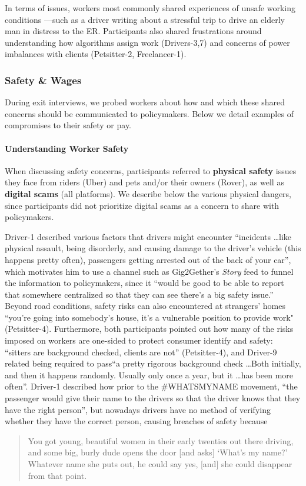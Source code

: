 In terms of issues, workers most commonly shared experiences of unsafe working conditions ---such as a driver writing about a stressful trip to drive an elderly man in distress to the ER. 
Participants also shared frustrations around understanding how algorithms assign work (Drivers-3,7) and concerns of power imbalances with clients (Petsitter-2, Freelancer-1).

\subsubsection{{Safety \& Wages}} 

{During exit interviews, we probed workers about how and which these shared concerns should be communicated to policymakers.} Below we detail examples of compromises to their safety or pay. 

\paragraph{\textbf{Understanding Worker Safety}}
When discussing safety concerns, participants referred to \textbf{physical safety} issues they face from riders (Uber) and pets and/or their owners (Rover), as well as \textbf{digital scams} (all platforms). We describe below the various physical dangers, since participants did not prioritize digital scams as a concern to share with policymakers.

Driver-1 described various factors that drivers might encounter ``incidents \dots like physical assault, being disorderly, and causing damage to the driver's vehicle (this happens pretty often), passengers getting arrested out of the back of your car'', which motivates him to use a channel such as Gig2Gether's \textit{Story} feed to funnel the information to policymakers, since it ``would be good to be able to report that somewhere centralized so that they can see there's a big safety issue.''
Beyond road conditions, safety risks can also encountered at strangers' homes ``you're going into somebody's house, it's a vulnerable position to provide work" (Petsitter-4). Furthermore, both participants pointed out how many of the risks imposed on workers are one-sided to protect consumer identify and safety: ``sitters are background checked, clients are not'' (Petsitter-4), and Driver-9 related being required to pass``a pretty rigorous background check \dots Both initially, and then it happens randomly. Usually only once a year, but it \dots has been more often''. Driver-1 described how prior to the \#WHATSMYNAME movement, ``the passenger would give their name to the drivers so that the driver knows that they have the right person'', but nowadays drivers have no method of verifying whether they have the correct person, causing breaches of safety because 
\begin{quote}
    You got young, beautiful women in their early twenties out there driving, and some big, burly dude opens the door [and asks] `What's my name?' Whatever name she puts out, he could say yes, [and] she could disappear from that point.
\end{quote}

